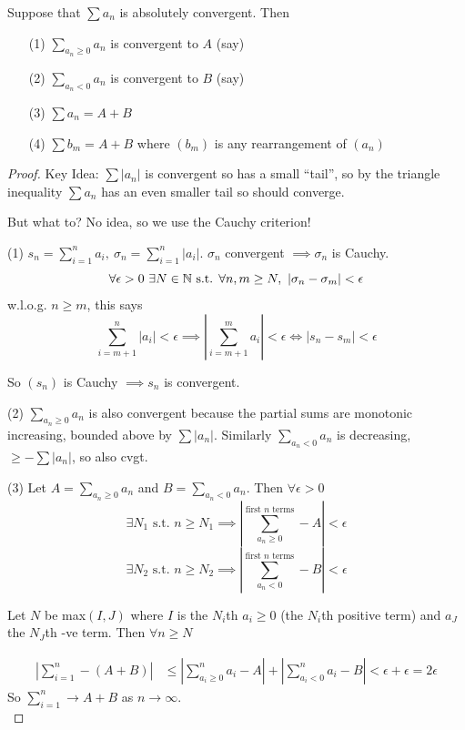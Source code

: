 \documentclass[twoside]{scrartcl}
\begin{document}
\begin{theorem}
Suppose that $\sum a_n$ is absolutely convergent. Then
\begin{itemize}
\item[(1)] $\sum_{a_n \geq 0} a_n$ is convergent to $A$ (say)	
\item[(2)] $\sum_{a_n < 0} a_n$ is convergent to $B$ (say)	
\item[(3)] $\sum a_n = A+B$
\item[(4)] $\sum b_m = A+B$ where $(b_m)$ is any rearrangement of $(a_n)$
\end{itemize}
\end{theorem}

\begin{proof} 
Key Idea: $\sum |a_n|$ is convergent so has a small ``tail'', so by the triangle inequality $\sum a_n$ has an even smaller tail so should converge. 

But what to? No idea, so we use the Cauchy criterion! 

(1) $s_n = \sum_{i=1}^n a_i,~\sigma_n = \sum_{i=1}^n |a_i|$. $\sigma_n$ convergent $\implies \sigma_n$ is Cauchy. 
\[\forall \epsilon > 0~\exists N \in\mathbb{N} \text{ s.t. } \forall n,m \geq N,~|\sigma_n - \sigma_m | < \epsilon\]
w.l.o.g. $n \geq m$, this says 
\[\sum_{i=m+1}^n |a_i| < \epsilon \implies \left|\sum_{i=m+1}^m a_i \right| < \epsilon \iff |s_n - s_m| < \epsilon\]

So $(s_n)$ is Cauchy $\implies s_n$ is convergent. 

(2) $\sum_{a_n \geq 0} a_n$ is also convergent because the partial sums are monotonic increasing, bounded above by $\sum |a_n|$. Similarly $\sum_{a_n < 0} a_n$ is decreasing, $\geq -\sum |a_n|$, so also cvgt. 

(3) Let $A = \sum_{a_n \geq 0} a_n$ and $B = \sum_{a_n < 0} a_n$. Then $\forall \epsilon >0$
\[\exists N_1 \text{ s.t. } n \geq N_1 \implies \left| \sum_{a_n \geq 0}^{\text{first } n \text{ terms}} - A\right| < \epsilon \]
\[\exists N_2 \text{ s.t. } n \geq N_2 \implies \left| \sum_{a_n < 0}^{\text{first } n \text{ terms}} - B\right| < \epsilon \]

Let $N$ be max$(I,J)$ where $I$ is the $N_i$th $a_i \geq 0$ (the $N_i$th positive term) and $a_J$ the $N_J$th -ve term. Then $\forall n \geq N$

\[\begin{aligned}\left|\sum_{i=1}^n - (A+B)\right| 
&\leq \left|\sum_{a_i \geq 0}^n a_i - A\right| + \left|\sum_{a_i < 0}^n a_i - B\right| < \epsilon + \epsilon = 2\epsilon 
\end{aligned}
\]
So $\sum_{i=1}^n \to A+B$ as $n \to \infty$.\\


\end{proof}
\end{document}
